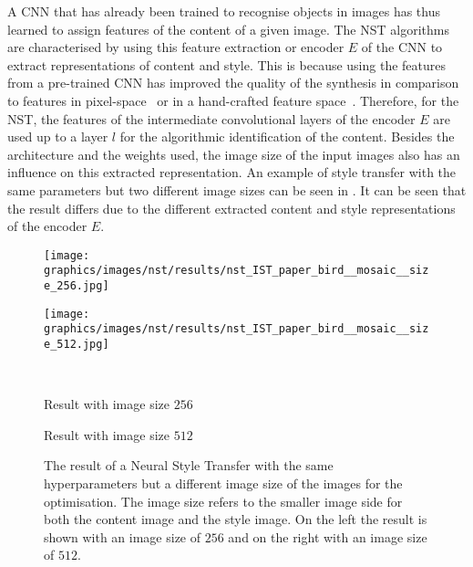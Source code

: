 A \gls{CNN} that has already been trained to recognise objects in images has thus learned to assign features of the content of a given image. The \gls{NST} algorithms are characterised by using this feature extraction or encoder $E$ of the \gls{CNN} to extract representations of content and style. This is because using the features from a pre-trained \gls{CNN} has improved the quality of the synthesis in comparison to features in pixel-space~\cite{EL1999} or in a hand-crafted feature space~\cite{PS2000}. Therefore, for the \gls{NST}, the features of the intermediate convolutional layers of the encoder $E$ are used up to a layer $l$ for the algorithmic identification of the content. Besides the architecture and the weights used, the image size of the input images also has an influence on this extracted representation. An example of style transfer with the same parameters but two different image sizes can be seen in . It can be seen that the result differs due to the different extracted content and style representations of the encoder $E$.
\begin{figure}
	\centering
	\begin{minipage}{.5\textwidth}
		\centering
		\texttt{[image: graphics/images/nst/results/nst\_IST\_paper\_bird\_\_mosaic\_\_size\_256.jpg]}
	\end{minipage}%
	\begin{minipage}{.5\textwidth}
		\centering
		\texttt{[image: graphics/images/nst/results/nst\_IST\_paper\_bird\_\_mosaic\_\_size\_512.jpg]}
	\end{minipage}\\ \vspace{0.15cm}
	\begin{minipage}{.5\textwidth}
		\centering
		Result with image size $256$
	\end{minipage}%
	\begin{minipage}{.5\textwidth}
		\centering
		Result with image size $512$
	\end{minipage}
	\caption{The result of a Neural Style Transfer with the same hyperparameters but a different image size of the images for the optimisation. The image size refers to the smaller image side for both the content image and the style image. On the left the result is shown with an image size of $256$ and on the right with an image size of $512$.}
	\label{fig:diff_size_nst}
\end{figure}

